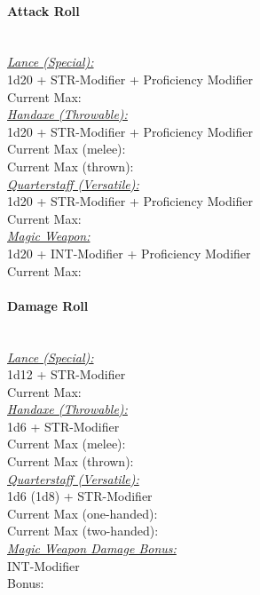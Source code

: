 \documentclass[letterpaper,openany,oneside,twocolumn]{book}
\begin{document}
\paragraph*{Attack Roll}\hfill\\
\underline{\textit{Lance (Special):}}\\
1d20 + STR-Modifier + Proficiency Modifier\\
\indent Current Max: 
\\
\underline{\textit{Handaxe (Throwable):}}\\
1d20 + STR-Modifier + Proficiency Modifier\\
\indent Current Max (melee): \\
\indent Current Max (thrown): 
\\
\underline{\textit{Quarterstaff (Versatile):}}\\
1d20 + STR-Modifier + Proficiency Modifier\\
\indent Current Max: 
\\
\underline{\textit{Magic Weapon:}}\\
1d20 + INT-Modifier + Proficiency Modifier\\
\indent Current Max: 
\paragraph*{Damage Roll}\hfill\\
\underline{\textit{Lance (Special):}}\\
1d12 + STR-Modifier\\
\indent Current Max: 
\\
\underline{\textit{Handaxe (Throwable):}}\\
1d6 + STR-Modifier\\
\indent Current Max (melee): \\
\indent Current Max (thrown): 
\\
\underline{\textit{Quarterstaff (Versatile):}}\\
1d6 (1d8) + STR-Modifier\\
\indent Current Max (one-handed): \\
\indent Current Max (two-handed): 
\\
\underline{\textit{Magic Weapon Damage Bonus:}}\\
INT-Modifier\\
\indent Bonus: \calculateModifier{\IntelligenceScoreValue}
\end{document}
